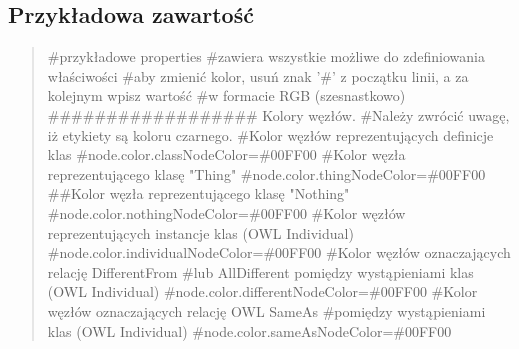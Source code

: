 \documentclass[a4paper,10pt]{article}
\begin{document}
\subsection{Przykładowa zawartość}
\begin{quote}

\#przykładowe properties \newline
\#zawiera wszystkie możliwe do zdefiniowania właściwości \newline
\#aby zmienić kolor, usuń znak '\#' z początku linii, a za kolejnym wpisz wartość \newline
\#w formacie RGB (szesnastkowo) \newline
 \newline
\#\#\#\#\#\#\#\#\#\#\#\#\#\#\#\#\#\# Kolory węzłów. \newline
\#Należy zwrócić uwagę, iż etykiety są koloru czarnego. \newline
 \newline
\#Kolor węzłów reprezentujących definicje klas \newline
\#node.color.classNodeColor=\#00FF00 \newline
 \newline
\#Kolor węzła reprezentującego klasę "Thing" \newline
\#node.color.thingNodeColor=\#00FF00 \newline
 \newline
\#\#Kolor węzła reprezentującego klasę "Nothing" \newline
\#node.color.nothingNodeColor=\#00FF00 \newline
 \newline
\#Kolor węzłów reprezentujących instancje klas (OWL Individual) \newline
\#node.color.individualNodeColor=\#00FF00 \newline
 \newline
\#Kolor węzłów oznaczających relację DifferentFrom \newline
\#lub AllDifferent pomiędzy wystąpieniami klas (OWL Individual) \newline
\#node.color.differentNodeColor=\#00FF00 \newline
 \newline
\#Kolor węzłów oznaczających relację OWL SameAs \newline
\#pomiędzy wystąpieniami klas (OWL Individual) \newline
\#node.color.sameAsNodeColor=\#00FF00 \newline
 \newline

\end{quote}
\end{document}
